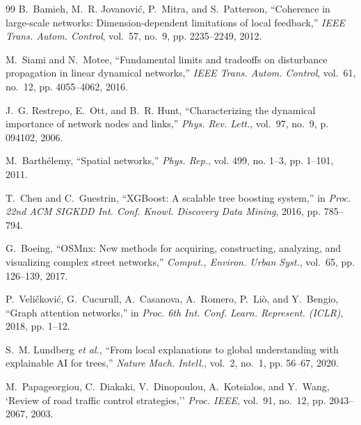 \documentclass[journal]{IEEEtran}
\begin{document}
\begin{thebibliography}{99}
B.~Bamieh, M.~R. Jovanovi\'c, P.~Mitra, and S.~Patterson, ``Coherence in large-scale networks: Dimension-dependent limitations of local feedback,'' \emph{IEEE Trans. Autom. Control}, vol.~57, no.~9, pp. 2235--2249, 2012.

M.~Siami and N.~Motee, ``Fundamental limits and tradeoffs on disturbance propagation in linear dynamical networks,'' \emph{IEEE Trans. Autom. Control}, vol.~61, no.~12, pp. 4055--4062, 2016.

J.~G. Restrepo, E.~Ott, and B.~R. Hunt, ``Characterizing the dynamical importance of network nodes and links,'' \emph{Phys. Rev. Lett.}, vol.~97, no.~9, p. 094102, 2006.

M.~Barth\'elemy, ``Spatial networks,'' \emph{Phys. Rep.}, vol. 499, no. 1--3, pp. 1--101, 2011.

T.~Chen and C.~Guestrin, ``{XGBoost}: A scalable tree boosting system,'' in \emph{Proc. 22nd ACM SIGKDD Int. Conf. Knowl. Discovery Data Mining}, 2016, pp. 785--794.

G.~Boeing, ``{OSMnx}: New methods for acquiring, constructing, analyzing, and visualizing complex street networks,'' \emph{Comput., Environ. Urban Syst.}, vol.~65, pp. 126--139, 2017.

P.~Veli\v{c}kovi\'c, G.~Cucurull, A.~Casanova, A.~Romero, P.~Li\`o, and Y.~Bengio, ``Graph attention networks,'' in \emph{Proc. 6th Int. Conf. Learn. Represent. (ICLR)}, 2018, pp. 1--12.

S.~M. Lundberg \emph{et al.}, ``From local explanations to global understanding with explainable {AI} for trees,'' \emph{Nature Mach. Intell.}, vol.~2, no.~1, pp. 56--67, 2020.

M.~Papageorgiou, C.~Diakaki, V.~Dinopoulou, A.~Kotsialos, and Y.~Wang, `Review of road traffic control strategies,'' \emph{Proc. IEEE}, vol.~91, no.~12, pp. 2043--2067, 2003.

\end{thebibliography}
\end{document}
